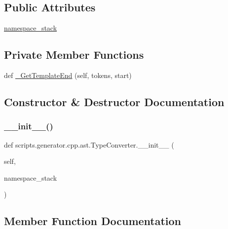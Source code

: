 \subsection*{Public Attributes}
\begin{DoxyCompactItemize}
\item 
\mbox{\hyperlink{classscripts_1_1generator_1_1cpp_1_1ast_1_1_type_converter_a4d4cfee01c25ca73fb68ae5d7d3ca7a2}{namespace\+\_\+stack}}
\end{DoxyCompactItemize}
\subsection*{Private Member Functions}
\begin{DoxyCompactItemize}
\item 
def \mbox{\hyperlink{classscripts_1_1generator_1_1cpp_1_1ast_1_1_type_converter_a67bf1ed4290fb7be21752d28262fb285}{\+\_\+\+Get\+Template\+End}} (self, tokens, start)
\end{DoxyCompactItemize}


\subsection{Constructor \& Destructor Documentation}
\mbox{\label{classscripts_1_1generator_1_1cpp_1_1ast_1_1_type_converter_ada997c1f3bb82d55335a8985a08a23aa}} 
\subsubsection{\texorpdfstring{\_\_init\_\_()}{\_\_init\_\_()}}
{\footnotesize\ttfamily def scripts.\+generator.\+cpp.\+ast.\+Type\+Converter.\+\_\+\+\_\+init\+\_\+\+\_\+ (\begin{DoxyParamCaption}\item[{}]{self,  }\item[{}]{namespace\+\_\+stack }\end{DoxyParamCaption})}



\subsection{Member Function Documentation}
\mbox{\label{classscripts_1_1generator_1_1cpp_1_1ast_1_1_type_converter_a67bf1ed4290fb7be21752d28262fb285}} 
